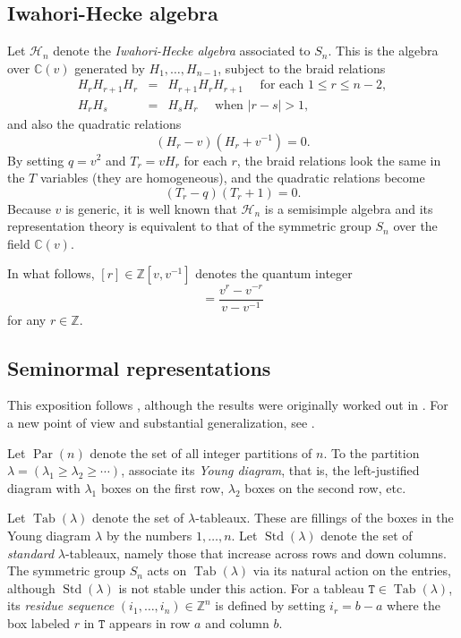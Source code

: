 \documentclass [12pt, letterpaper, oneside] {amsart}
\newcommand \Par {\operatorname {Par}}
\newcommand \Tab {\operatorname {Tab}}
\newcommand \Std {\operatorname {Std}}
\renewcommand \l {\lambda}
\newcommand \mc {\mathcal}
\newcommand \mB {\mathbb}
\newcommand \mt {\mathtt}
\theoremstyle {plain}
\begin{document}
\subsection {Iwahori-Hecke algebra}
Let $\mc{H}_n$ denote the \emph {Iwahori-Hecke algebra} associated to $S_n$.  This is the algebra over $\mB{C}(v)$ generated by $H_1, \ldots, H_{n-1}$, 
subject to the braid relations
\begin {eqnarray*}
    H_r H_{r+1} H_r &=& H_{r+1} H_r H_{r+1} \quad \text { for each } 1 \le r \le n-2, \\
    H_r H_s &=& H_s H_r \quad \text { when } |r - s| > 1,
\end {eqnarray*}
and also the quadratic relations
\begin {equation*}
    (H_r - v)(H_r + v^{-1}) = 0.
\end {equation*}
By setting $q=v^2$ and $T_r = v H_r$ for each $r$, the braid relations look the same in the $T$ variables (they are homogeneous), and the quadratic relations become
\begin {equation*}
    (T_r - q)(T_r + 1) = 0.
\end {equation*}
Because $v$ is generic, it is well known that
$\mc{H}_n$ is a semisimple algebra and its representation theory is equivalent to that of the symmetric group $S_n$ over the field $\mB{C}(v)$.

In what follows, $[r] \in \mB{Z}[v,v^{-1}]$ denotes the quantum integer
\begin {equation}
[r] = \frac {v^r - v^{-r}} {v - v^{-1}} \label {q int}
\end {equation}
for any $r \in \mB{Z}$.

\subsection {Seminormal representations}
This exposition follows \cite[section 3]{Ram}, although the results were originally worked out in \cite {Hoefsmit}.  For a new point of view and substantial generalization, see \cite[section 5]{BK}.

Let $\Par(n)$ denote the set of all integer partitions of $n$.  To the partition $\l = (\l_1 \ge \l_2 \ge \cdots)$, associate its \emph {Young diagram}, that is, the left-justified diagram with $\l_1$ boxes on the first row, $\l_2$ boxes on the second row, etc.

Let $\Tab(\l)$ denote the set of $\l$-tableaux.  These are fillings of the boxes in the Young diagram $\l$ by the numbers $1, \dots, n$.  Let $\Std(\l)$ denote the set of \emph {standard} $\l$-tableaux, namely those that increase across rows and down columns.  The symmetric group $S_n$ acts on $\Tab(\l)$ via its natural action on the entries, although $\Std(\l)$ is not stable under this action.
For a tableau $\mt{T} \in \Tab(\l)$, its {\em residue sequence}
$(i_1,\dots,i_n) \in \mB{Z}^n$ 
is defined by setting $i_r = b-a$ where the box labeled
$r$ in $\mt{T}$ appears in row $a$ and column $b$.
\end{document}
